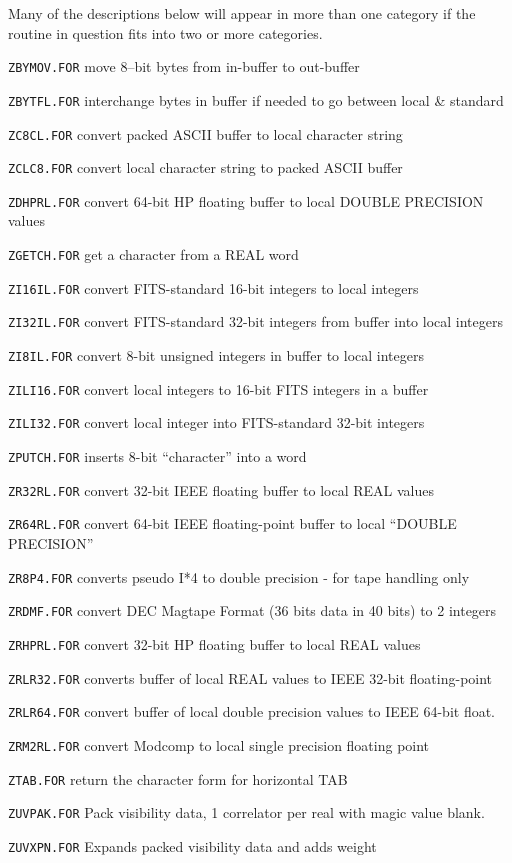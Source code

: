 \noindent Many of the descriptions below will appear in more than one
category if the routine in question fits into two or more categories.
\bigskip
{\parindent=3cm

\medskip

\item{\tt ZBYMOV.FOR} move 8--bit bytes from in-buffer to out-buffer
\item{\tt ZBYTFL.FOR} interchange bytes in buffer if needed to go between
	local \& standard
\item{\tt ZC8CL.FOR} convert packed ASCII buffer to local character string
\item{\tt ZCLC8.FOR} convert local character string to packed ASCII buffer
\item{\tt ZDHPRL.FOR} convert 64-bit HP floating buffer to local DOUBLE
	PRECISION values
\item{\tt ZGETCH.FOR} get a character from a REAL word
\item{\tt ZI16IL.FOR} convert FITS-standard 16-bit integers to local integers
\item{\tt ZI32IL.FOR} convert FITS-standard 32-bit integers from buffer
	into local integers
\item{\tt ZI8IL.FOR} convert 8-bit unsigned integers in buffer to local
	integers
\item{\tt ZILI16.FOR} convert local integers to 16-bit FITS integers in a
	buffer
\item{\tt ZILI32.FOR} convert local integer into FITS-standard 32-bit integers
\item{\tt ZPUTCH.FOR} inserts 8-bit ``character'' into a word
\item{\tt ZR32RL.FOR} convert 32-bit IEEE floating buffer to local REAL values
\item{\tt ZR64RL.FOR} convert 64-bit IEEE floating-point buffer to local
	``DOUBLE PRECISION''
\item{\tt ZR8P4.FOR} converts pseudo I*4 to double precision - for tape
	handling only
\item{\tt ZRDMF.FOR} convert DEC Magtape Format (36 bits data in 40 bits)
	to 2 integers
\item{\tt ZRHPRL.FOR} convert 32-bit HP floating buffer to local REAL values
\item{\tt ZRLR32.FOR} converts buffer of local REAL values to IEEE 32-bit
	floating-point
\item{\tt ZRLR64.FOR} convert buffer of local double precision values to
	IEEE 64-bit float.
\item{\tt ZRM2RL.FOR} convert Modcomp to local single precision floating point
\item{\tt ZTAB.FOR} return the character form for horizontal TAB
\item{\tt ZUVPAK.FOR} Pack visibility data, 1 correlator per real with
	magic value blank.
\item{\tt ZUVXPN.FOR} Expands packed visibility data and adds weight

}
